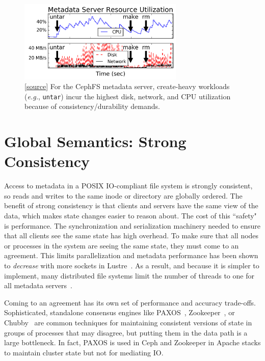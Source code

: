 \begin{figure}[t]
  \centering
  \includegraphics[width=0.7\textwidth]{./chapters/cudele/figures/overhead-creates.png}
  \caption{[\href{https://github.com/michaelsevilla/cudele-popper/blob/master/experiments/baseline-compile/visualize/viz.ipynb}{source}]
  For the CephFS metadata server, create-heavy workloads ({\it e.g.},
  \texttt{untar}) incur the highest disk, network, and CPU utilization because of
  consistency/durability demands.}\label{fig:overhead-creates}
\end{figure}

\section{Global Semantics: Strong Consistency}

Access to metadata in a POSIX IO-compliant file system is strongly consistent,
so reads and writes to the same inode or directory are globally ordered.  The
benefit of strong consistency is that clients and servers have the same view of
the data, which makes state changes easier to reason about.  The cost of this
``safety" is performance.  The synchronization and serialization machinery
needed to ensure that all clients see the same state has high overhead.  To
make sure that all nodes or processes in the system are seeing the same state,
they must come to an agreement.  This limits parallelization and metadata
performance has been shown to {\it decrease} with more sockets in
Lustre~\cite{konstantinos:pdsw2014-lustre-metadata}. As a result, and because
it is simpler to implement, many distributed file systems limit the number of
threads to one for all metadata servers~\cite{weil:osdi2006-ceph,
alam:pdsw2011-metadata-scaling, ren:sc2014-indexfs}. 

Coming to an agreement has its own set of performance and accuracy trade-offs.
Sophisticated, standalone consensus engines like
PAXOS~\cite{lamport_parttime_1998}, Zookeeper~\cite{hunt_zookeeper_2010}, or
Chubby~\cite{burrows_chubby_2006} are common techniques for maintaining
consistent versions of state in groups of processes that may disagree, but
putting them in the data path is a large bottleneck. In fact, PAXOS is used in
Ceph and Zookeeper in Apache stacks to maintain cluster state but not for
mediating IO.  

